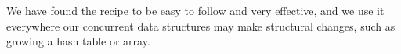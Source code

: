 \documentclass[10pt,letterpaper,twocolumn,english]{article}
\newcommand{\yad}{LLADD\xspace}
\begin{document}
We have found the recipe to be easy to follow and very effective, and
we use it everywhere our concurrent data structures may make structural 
changes, such as growing a hash table or array.




\end{document}
